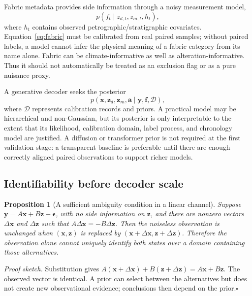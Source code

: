 \documentclass[11pt,a4paper]{article}
\newtheorem{proposition}{Proposition}
\begin{document}
Fabric metadata provides side information through a noisy measurement model,
\begin{equation}\label{eq:fabric}
p(f_t\mid z_{d,t},z_{m,t},h_t),
\end{equation}
where $h_t$ contains observed petrographic/stratigraphic covariates. Equation~\ref{eq:fabric} must be calibrated from real paired samples; without paired labels, a model cannot infer the physical meaning of a fabric category from its name alone. Fabric can be climate-informative as well as alteration-informative. Thus it should not automatically be treated as an exclusion flag or as a pure nuisance proxy.

A generative decoder seeks the posterior
\begin{equation}\label{eq:posterior}
p(\mathbf x,\mathbf z_d,\mathbf z_m,\mathbf a\mid \mathbf y,\mathbf f,\mathcal D),
\end{equation}
where $\mathcal D$ represents calibration records and priors. A practical model may be hierarchical and non-Gaussian, but its posterior is only interpretable to the extent that its likelihood, calibration domain, label process, and chronology model are justified. A diffusion or transformer prior is not required at the first validation stage: a transparent baseline is preferable until there are enough correctly aligned paired observations to support richer models.

\subsection{Identifiability before decoder scale}
\begin{proposition}[A sufficient ambiguity condition in a linear channel]
Suppose $\mathbf y=A\mathbf x+B\mathbf z+\boldsymbol\epsilon$, with no side information on $\mathbf z$, and there are nonzero vectors $\Delta\mathbf x$ and $\Delta\mathbf z$ such that $A\Delta\mathbf x=-B\Delta\mathbf z$. Then the noiseless observation is unchanged when $(\mathbf x,\mathbf z)$ is replaced by $(\mathbf x+\Delta\mathbf x,\mathbf z+\Delta\mathbf z)$. Therefore the observation alone cannot uniquely identify both states over a domain containing those alternatives.
\end{proposition}
\noindent\emph{Proof sketch.} Substitution gives $A(\mathbf x+\Delta\mathbf x)+B(\mathbf z+\Delta\mathbf z)=A\mathbf x+B\mathbf z$. The observed vector is identical. A prior can select between the alternatives but does not create new observational evidence; conclusions then depend on the prior.\hfill$\square$
\end{document}
